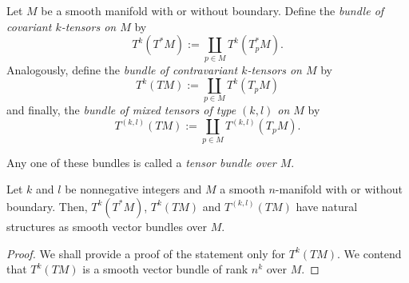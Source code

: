 \begin{definition}
    Let $M$ be a smooth manifold with or without boundary. Define the \emph{bundle of covariant $k$-tensors on $M$} by 
    \begin{equation*}
        T^k\left(T^*M\right) := \coprod_{p\in M}T^k(T_p^*M).
    \end{equation*}
    Analogously, define the \emph{bundle of contravariant $k$-tensors on $M$} by 
    \begin{equation*}
        T^k\left(TM\right) := \coprod_{p\in M}T^k(T_pM)
    \end{equation*}
    and finally, the \emph{bundle of mixed tensors of type $(k,l)$ on $M$} by 
    \begin{equation*}
        T^{(k,l)}\left(TM\right) := \coprod_{p\in M} T^{(k,l)}(T_pM).
    \end{equation*}

    Any one of these bundles is called a \emph{tensor bundle over $M$}.
\end{definition}

\begin{theorem}
    Let $k$ and $l$ be nonnegative integers and $M$ a smooth $n$-manifold with or without boundary. Then, $T^k(T^*M)$, $T^k(TM)$ and $T^{(k,l)}(TM)$ have natural structures as smooth vector bundles over $M$.
\end{theorem}
\begin{proof}
    We shall provide a proof of the statement only for $T^k(TM)$. We contend that $T^k(TM)$ is a smooth vector bundle of rank $n^k$ over $M$. 
\end{proof}